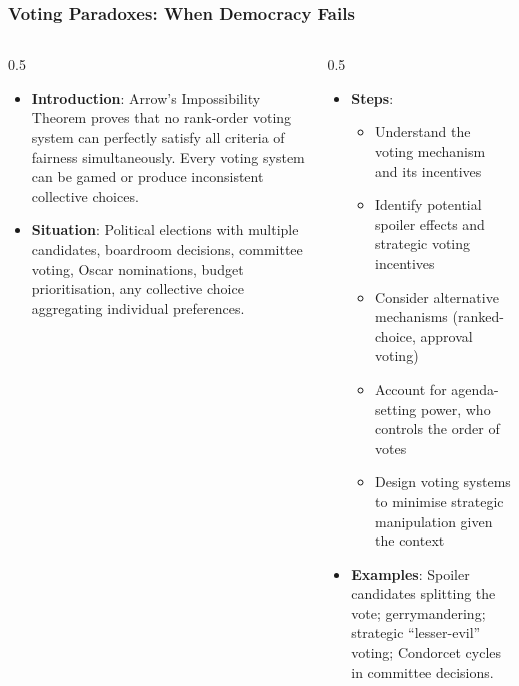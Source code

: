 \begin{frame}[fragile]\frametitle{Voting Paradoxes: When Democracy Fails}
\begin{columns}
    \begin{column}[T]{0.5\linewidth}
      \begin{itemize}
        \item \textbf{Introduction}: Arrow's Impossibility Theorem proves that no rank-order voting system can perfectly satisfy all criteria of fairness simultaneously. Every voting system can be gamed or produce inconsistent collective choices.
        \item \textbf{Situation}: Political elections with multiple candidates, boardroom decisions, committee voting, Oscar nominations, budget prioritisation, any collective choice aggregating individual preferences.
      \end{itemize}
    \end{column}
    \begin{column}[T]{0.5\linewidth}
      \begin{itemize}
        \item \textbf{Steps}:
        \begin{itemize}
          \item Understand the voting mechanism and its incentives
          \item Identify potential spoiler effects and strategic voting incentives
          \item Consider alternative mechanisms (ranked-choice, approval voting)
          \item Account for agenda-setting power, who controls the order of votes
          \item Design voting systems to minimise strategic manipulation given the context
        \end{itemize}\item \textbf{Examples}: Spoiler candidates splitting the vote; gerrymandering; strategic ``lesser-evil'' voting; Condorcet cycles in committee decisions.
      \end{itemize}
    \end{column}
  \end{columns}
\end{frame}

